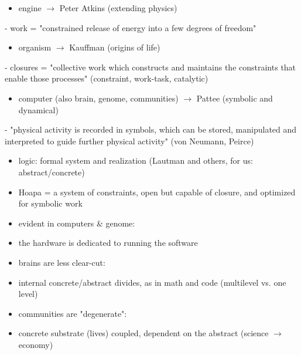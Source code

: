 \documentclass[a4paper,10pt]{article}
\newcommand{\marked}[1]{\par\addvspace{2pt}{\bfseries #1}\par\nopagebreak}
\renewenvironment{leftbar}{%
  \def\FrameCommand{{\color{black!30}\vrule width 1.2pt}\hspace{6pt}}%
  \MakeFramed{\advance\hsize-\width \FrameRestore}}{\endMakeFramed}
\newenvironment{commentary}{\par\vspace{-2pt}\begin{leftbar}\color{black!80}}{\end{leftbar}}
\begin{document}
\begin{commentary}
\marked{\textcolor{energyorange}{Work}}
\begin{itemize}
\item engine \ensuremath{\to} Peter Atkins (extending physics)
\end{itemize}
- work = "constrained release of energy into a few degrees of freedom"\par
\begin{itemize}
\item organism \ensuremath{\to} Kauffman (origins of life)
\end{itemize}
- closures = "collective work which constructs and maintains the constraints that enable those processes" (constraint, work-task, catalytic)\par
\begin{itemize}
\item computer (also brain, genome, communities) \ensuremath{\to} Pattee (symbolic and dynamical)
\end{itemize}
- "physical activity is recorded in symbols, which can be stored, manipulated and interpreted to guide further physical activity" (von Neumann, Peirce)\par
\begin{itemize}
\item logic: formal system and realization (Lautman and others, for us: abstract/concrete)
\item Hoapa = a system of constraints, open but capable of closure, and optimized for symbolic work
\end{itemize}
\marked{\textcolor{dedicationmagenta}{Dedicated}}
\begin{itemize}
\item evident in computers \& genome:
\item the hardware is dedicated to running the software
\end{itemize}\vspace{2pt}
\begin{itemize}
\item brains are less clear-cut:
\item internal concrete/abstract divides, as in math and code (multilevel vs. one level)
\end{itemize}\vspace{2pt}
\begin{itemize}
\item communities are "degenerate":
\item concrete substrate (lives) coupled, dependent on the abstract (science \ensuremath{\to} economy)

\end{itemize}
\end{commentary}
\end{document}

